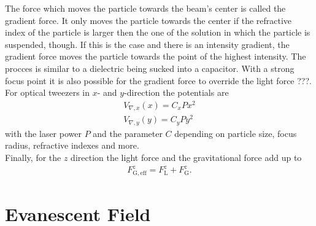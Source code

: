 \documentclass[.../bericht]{subfilies}
\begin{document}
        The force which moves the particle towards the beam's center is called the gradient force. It only moves the particle towards the center if the refractive index of the particle is larger then the one of the solution in which the particle is suspended, though. If this is the case and there is an intensity gradient, the gradient force moves the particle towards the point of the highest intensity. The procces is similar to a dielectric being sucked into a capacitor. With a strong focus point it is also possible for the gradient force to override the light force ???. For optical tweezers in $x$- and $y$-direction the potentials are
        \begin{align}
          V_{\nabla,x}(x)=C_xPx^2\\
          V_{\nabla,y}(y)=C_yPy^2
        \end{align}
        with the laser power $P$ and the parameter $C$ depending on particle size, focus radius, refractive indexes and more. \\
        Finally, for the $z$ direction the light force and the gravitational force add up to
        \begin{align}
          F_\mathrm{G,eff}^z=F_\mathrm{L}^z+F_\mathrm{G}^z.
        \end{align}


      \section{Evanescent Field}
      \label{sec:evanenscent}
\end{document}
